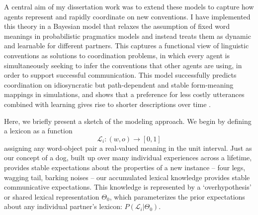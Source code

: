 \documentclass[11pt]{article}
\begin{document}

A central aim of my dissertation work was to extend these models to capture how agents represent and rapidly coordinate on new conventions.%
I have implemented this theory in a Bayesian model that relaxes the assumption of fixed word meanings in probabilistic pragmatics models and instead treats them as dynamic and learnable for different partners. 
This captures a functional view of linguistic conventions as solutions to coordination problems, in which every agent is simultaneously seeking to infer the conventions that other agents are using, in order to support successful communication. 
This model successfully predicts coordination on idiosyncratic but path-dependent and stable form-meaning mappings in simulations, and shows that a preference for less costly utterances combined with learning gives rise to shorter descriptions over time \cite{hawkins_convention-formation_2017}.


Here, we briefly present a sketch of the modeling approach. We begin by defining a lexicon as a function $$\mathcal{L}_i: (w, o) \rightarrow [0,1]$$ assigning any word-object pair a real-valued meaning in the unit interval. Just as our concept of a dog, built up over many individual experiences across a lifetime, provides stable expectations about the properties of a new instance -- four legs, wagging tail, barking noises -- our accumulated lexical knowledge provides stable communicative expectations. 
This knowledge is represented by a `overhypothesis' or shared lexical representation $\Theta_0$, which parameterizes the prior expectations about any individual partner's lexicon: $P(\mathcal{L}_i | \Theta_0)$. 

\end{document}
